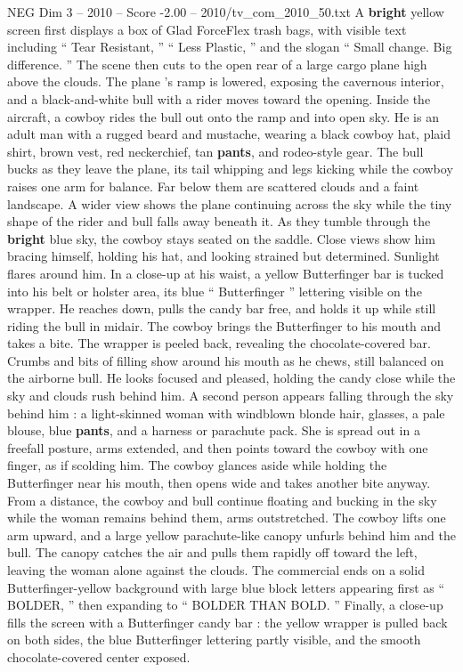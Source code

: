 \begin{textsample}{NEG Dim 3 – 2010 – Score -2.00 – 2010/tv\_com\_2010\_50.txt}  \label{ex:f3_neg_012}
A \textbf{bright} yellow screen first displays a box of Glad ForceFlex trash bags, with visible text including “ Tear Resistant, ” “ Less Plastic, ” and the slogan “ Small change.
Big difference. ” The scene then cuts to the open rear of a large cargo plane high above the clouds.
The plane ’s ramp is lowered, exposing the cavernous interior, and a black-and-white bull with a rider moves toward the opening.
Inside the aircraft, a cowboy rides the bull out onto the ramp and into open sky.
He is an adult man with a rugged beard and mustache, wearing a black cowboy hat, plaid shirt, brown vest, red neckerchief, tan \textbf{pants}, and rodeo-style gear.
The bull bucks as they leave the plane, its tail whipping and legs kicking while the cowboy raises one arm for balance.
Far below them are scattered clouds and a faint landscape.
A wider view shows the plane continuing across the sky while the tiny shape of the rider and bull falls away beneath it.
As they tumble through the \textbf{bright} blue sky, the cowboy stays seated on the saddle.
Close views show him bracing himself, holding his hat, and looking strained but determined.
Sunlight flares around him.
In a close-up at his waist, a yellow Butterfinger bar is tucked into his belt or holster area, its blue “ Butterfinger ” lettering visible on the wrapper.
He reaches down, pulls the candy bar free, and holds it up while still riding the bull in midair.
The cowboy brings the Butterfinger to his mouth and takes a bite.
The wrapper is peeled back, revealing the chocolate-covered bar.
Crumbs and bits of filling show around his mouth as he chews, still balanced on the airborne bull.
He looks focused and pleased, holding the candy close while the sky and clouds rush behind him.
A second person appears falling through the sky behind him : a light-skinned woman with windblown blonde hair, glasses, a pale blouse, blue \textbf{pants}, and a harness or parachute pack.
She is spread out in a freefall posture, arms extended, and then points toward the cowboy with one finger, as if scolding him.
The cowboy glances aside while holding the Butterfinger near his mouth, then opens wide and takes another bite anyway.
From a distance, the cowboy and bull continue floating and bucking in the sky while the woman remains behind them, arms outstretched.
The cowboy lifts one arm upward, and a large yellow parachute-like canopy unfurls behind him and the bull.
The canopy catches the air and pulls them rapidly off toward the left, leaving the woman alone against the clouds.
The commercial ends on a solid Butterfinger-yellow background with large blue block letters appearing first as “ BOLDER, ” then expanding to “ BOLDER THAN BOLD. ” Finally, a close-up fills the screen with a Butterfinger candy bar : the yellow wrapper is pulled back on both sides, the blue Butterfinger lettering partly visible, and the smooth chocolate-covered center exposed.

\end{textsample}
